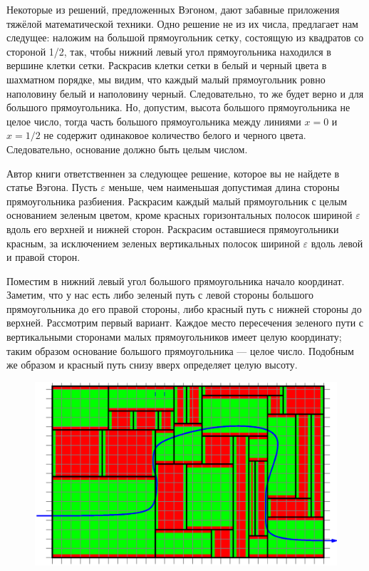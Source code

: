 Некоторые из решений, предложенных Вэгоном, дают забавные приложения тяжёлой математической техники.
Одно решение не из их числа, предлагает нам следущее:
наложим на большой прямоугольник сетку,  состоящую из квадратов со стороной 1/2,  так, чтобы нижний  левый угол прямоугольника находился в вершине клетки сетки.  
Раскрасив клетки сетки в белый и черный цвета в шахматном порядке, 
мы видим, что каждый малый прямоугольник ровно наполовину белый и наполовину черный. Следовательно, то же будет верно и для большого  прямоугольника.
Но, допустим, высота большого  прямоугольника не  целое число, тогда часть 
большого  прямоугольника между линиями  $x=0$ и   $x=1/2$  не содержит одинаковое количество белого и черного цвета. 
Следовательно, основание должно быть целым числом.\heart


Автор книги ответственнен за следующее решение, которое вы не найдете в статье Вэгона.
Пусть $\varepsilon$ меньше, чем наименьшая допустимая длина стороны прямоугольника разбиения.
Раскрасим каждый малый прямоугольник с целым основанием зеленым цветом, кроме красных горизонтальных  полосок  шириной $\varepsilon$ вдоль его верхней и нижней  сторон.
Раскрасим оставшиеся прямоугольники красным, за исключением зеленых вертикальных   полосок  шириной $\varepsilon$ вдоль левой и правой сторон.


Поместим в нижний левый  угол  большого прямоугольника начало координат. 
Заметим, что у нас есть либо зеленый путь с левой стороны  большого прямоугольника до его правой стороны, либо красный путь с нижней стороны до верхней. 
Рассмотрим первый вариант.
Каждое  место пересечения  зеленого пути с вертикальными  сторонами  малых прямоугольников имеет целую координату; таким образом основание большого прямоугольника --- целое число.
Подобным же образом и красный путь снизу вверх определяет целую высоту.



\begin{figure}[h!]
\centering
\includegraphics[scale=0.5]{Figs/Insight/green}
\end{figure}




